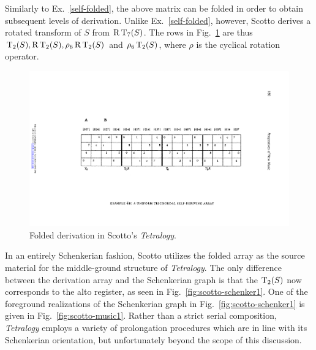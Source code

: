 \begin{example}
	\noindent Similarly to Ex.~\ref{self-folded}, the above matrix can be folded in order to obtain subsequent levels of derivation. Unlike Ex.~\ref{self-folded}, however, Scotto derives a rotated transform of $S$ from $\operatorname{R}\operatorname{T}_7(S)$. The rows in Fig.~\ref{fig:scotto-folded} are thus $\operatorname{T}_2(S), \operatorname{R}\operatorname{T}_2(S), \rho_6\operatorname{R}\operatorname{T}_2(S)$ and $\rho_6\operatorname{T}_2(S)$, where $\rho$ is the cyclical rotation operator.
	
	\begin{figure}[htbp]
    	\centering
		\includegraphics[width=6.5in]{figures/scotto-folded.pdf}
		\caption[Folded derivation in Scotto's \emph{Tetralogy}]{Folded derivation in Scotto's \emph{Tetralogy}.}
    	\label{fig:scotto-folded}
	\end{figure}
	
	\noindent In an entirely Schenkerian fashion, Scotto utilizes the folded array as the source material for the middle-ground structure of \emph{Tetralogy}. The only difference between the derivation array and the Schenkerian graph is that the $\operatorname{T}_2(S)$ now corresponds to the alto register, as seen in Fig.~\ref{fig:scotto-schenker1}. One of the foreground realizations of the Schenkerian graph in Fig.~\ref{fig:scotto-schenker1} is given in Fig.~\ref{fig:scotto-music1}. Rather than a strict serial composition, \emph{Tetralogy} employs a variety of prolongation procedures which are in line with its Schenkerian orientation, but unfortunately beyond the scope of this discussion.
	

\end{example}
